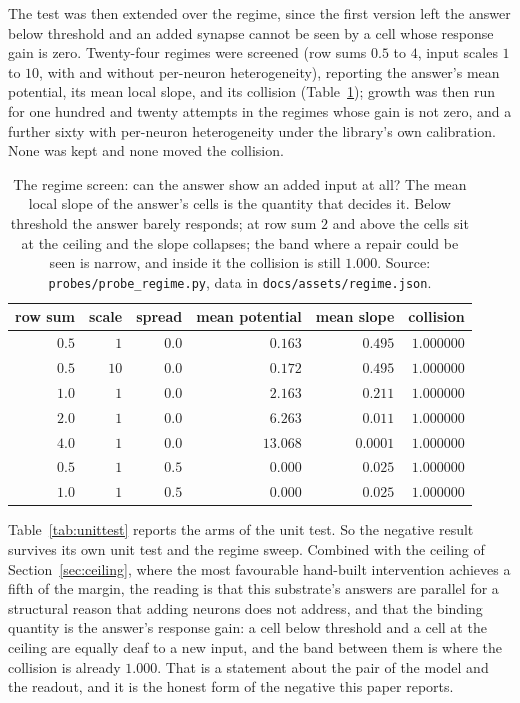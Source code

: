 \documentclass[11pt]{article}
\theoremstyle{remark}
\begin{document}
The test was then extended over the regime, since the first version left the answer below threshold
and an added synapse cannot be seen by a cell whose response gain is zero. Twenty-four regimes were
screened (row sums $0.5$ to $4$, input scales $1$ to $10$, with and without per-neuron
heterogeneity), reporting the answer's mean potential, its mean local slope, and its collision
(Table~\ref{tab:regime}); growth
was then run for one hundred and twenty attempts in the regimes whose gain is not zero, and a further
sixty with per-neuron heterogeneity under the library's own calibration. None was kept and none moved
the collision.

\begin{table}[t]
\centering
\small
\caption{The regime screen: can the answer show an added input at all? The mean local slope of the
answer's cells is the quantity that decides it. Below threshold the answer barely responds; at row sum
$2$ and above the cells sit at the ceiling and the slope collapses; the band where a repair could be
seen is narrow, and inside it the collision is still $1.000$. Source:
\texttt{probes/probe\_regime.py}, data in \texttt{docs/assets/regime.json}.}
\label{tab:regime}
\begin{tabular}{rrrrrr}
\toprule
row sum & scale & spread & mean potential & mean slope & collision \\
\midrule
$0.5$ & $1$ & $0.0$ & $0.163$ & $0.495$ & $1.000000$ \\
$0.5$ & $10$ & $0.0$ & $0.172$ & $0.495$ & $1.000000$ \\
$1.0$ & $1$ & $0.0$ & $2.163$ & $0.211$ & $1.000000$ \\
$2.0$ & $1$ & $0.0$ & $6.263$ & $0.011$ & $1.000000$ \\
$4.0$ & $1$ & $0.0$ & $13.068$ & $0.0001$ & $1.000000$ \\
$0.5$ & $1$ & $0.5$ & $0.000$ & $0.025$ & $1.000000$ \\
$1.0$ & $1$ & $0.5$ & $0.000$ & $0.025$ & $1.000000$ \\
\bottomrule
\end{tabular}
\end{table}

Table~\ref{tab:unittest} reports the arms of the unit test. So the negative result survives its own
unit test and the regime sweep. Combined with the ceiling of
Section~\ref{sec:ceiling}, where the most favourable hand-built intervention achieves a fifth of the
margin, the reading is that this substrate's answers are parallel for a structural reason that adding
neurons does not address, and that the binding quantity is the answer's response gain: a cell below
threshold and a cell at the ceiling are equally deaf to a new input, and the band between them is
where the collision is already $1.000$. That is a statement about the pair of the model and the
readout, and it is the honest form of the negative this paper reports.
\end{document}
